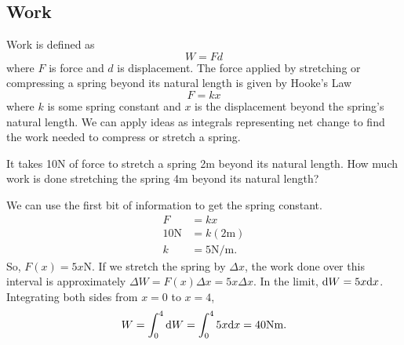 \subsection{Work}
Work is defined as
\begin{equation*}
	W = Fd
\end{equation*}
where $F$ is force and $d$ is displacement.
The force applied by stretching or compressing a spring beyond its natural length is given by Hooke's Law
\begin{equation*}
	F = kx
\end{equation*}
where $k$ is some spring constant and $x$ is the displacement beyond the spring's natural length.
We can apply ideas as integrals representing net change to find the work needed to compress or stretch a spring.

\begin{example}
	It takes 10N of force to stretch a spring 2m beyond its natural length.
	How much work is done stretching the spring 4m beyond its natural length?
\end{example}
We can use the first bit of information to get the spring constant.
\begin{align*}
	F &= kx \\
	10\text{N} &= k(2\text{m}) \\
	k &= 5\text{N/m}.
\end{align*}
\indent
So, $F(x)=5x\text{N}$.
If we stretch the spring by $\Delta x$, the work done over this interval is approximately $\Delta W = F(x)\Delta x= 5x\Delta x$.
In the limit, $\mathrm{d} W = 5x\mathrm{d} x$.
Integrating both sides from $x=0$ to $x=4$,
\begin{equation*}
	W = \int_{0}^{4}{\mathrm{d} W} = \int_{0}^{4}{5x\mathrm{d} x} = 40\text{Nm}.
\end{equation*}


